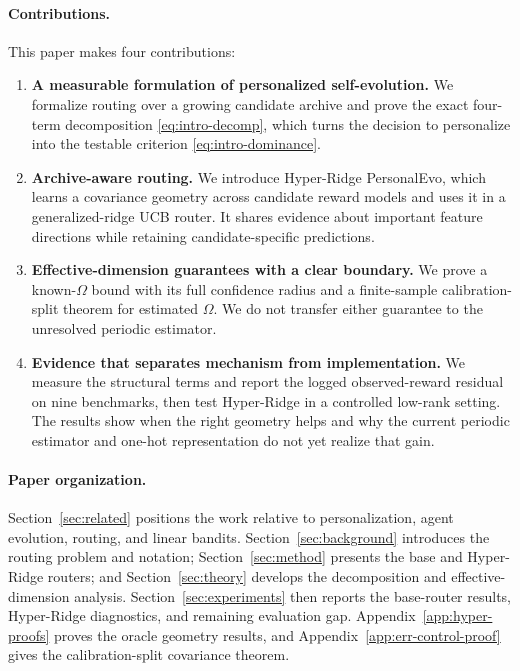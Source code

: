 \documentclass{article} %
\begin{document}
\paragraph{Contributions.}
This paper makes four contributions:
\begin{enumerate}
\item \textbf{A measurable formulation of personalized self-evolution.} We formalize routing over a growing candidate archive and prove the exact four-term decomposition \eqref{eq:intro-decomp}, which turns the decision to personalize into the testable criterion \eqref{eq:intro-dominance}.
\item \textbf{Archive-aware routing.} We introduce Hyper-Ridge PersonalEvo, which learns a covariance geometry across candidate reward models and uses it in a generalized-ridge UCB router. It shares evidence about important feature directions while retaining candidate-specific predictions.
\item \textbf{Effective-dimension guarantees with a clear boundary.} We prove a known-$\Omega$ bound with its full confidence radius and a finite-sample calibration-split theorem for estimated $\Omega$. We do not transfer either guarantee to the unresolved periodic estimator.
\item \textbf{Evidence that separates mechanism from implementation.} We measure the structural terms and report the logged observed-reward residual on nine benchmarks, then test Hyper-Ridge in a controlled low-rank setting. The results show when the right geometry helps and why the current periodic estimator and one-hot representation do not yet realize that gain.
\end{enumerate}

\paragraph{Paper organization.}
Section~\ref{sec:related} positions the work relative to personalization, agent evolution, routing, and linear bandits. Section~\ref{sec:background} introduces the routing problem and notation; Section~\ref{sec:method} presents the base and Hyper-Ridge routers; and Section~\ref{sec:theory} develops the decomposition and effective-dimension analysis. Section~\ref{sec:experiments} then reports the base-router results, Hyper-Ridge diagnostics, and remaining evaluation gap. Appendix~\ref{app:hyper-proofs} proves the oracle geometry results, and Appendix~\ref{app:err-control-proof} gives the calibration-split covariance theorem.
\end{document}
